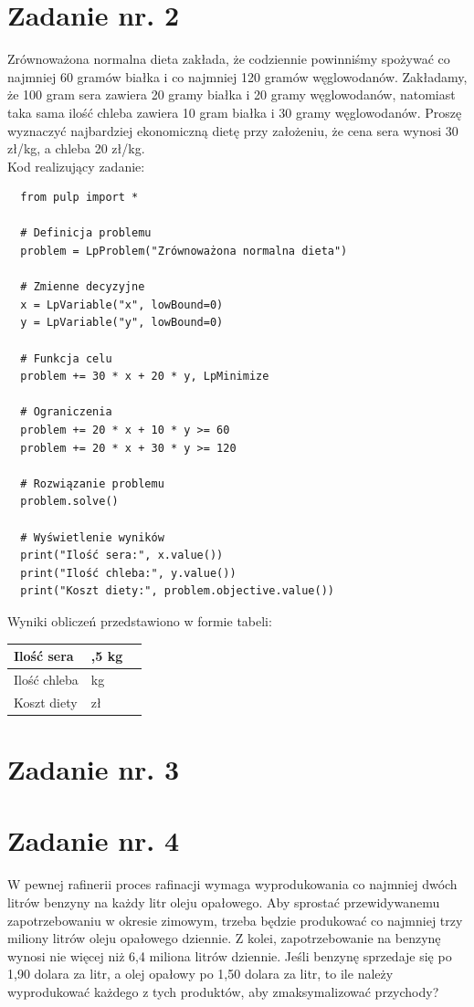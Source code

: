 \documentclass{article}
\begin{document}
\section{Zadanie nr. 2}
Zrównoważona normalna dieta zakłada, że codziennie powinniśmy spożywać co 
najmniej 60 gramów białka i co najmniej 120 gramów węglowodanów. Zakładamy, że 100 
gram sera zawiera 20 gramy białka i 20 gramy węglowodanów, natomiast taka sama ilość 
chleba zawiera 10 gram białka i 30 gramy węglowodanów. Proszę wyznaczyć najbardziej 
ekonomiczną dietę przy założeniu, że cena sera wynosi 30 zł/kg, a chleba 20 zł/kg.\\

Kod realizujący zadanie:
\begin{lstlisting}
  from pulp import *

  # Definicja problemu
  problem = LpProblem("Zrównoważona normalna dieta")
  
  # Zmienne decyzyjne
  x = LpVariable("x", lowBound=0)
  y = LpVariable("y", lowBound=0)
  
  # Funkcja celu
  problem += 30 * x + 20 * y, LpMinimize
  
  # Ograniczenia
  problem += 20 * x + 10 * y >= 60
  problem += 20 * x + 30 * y >= 120
  
  # Rozwiązanie problemu
  problem.solve()
  
  # Wyświetlenie wyników
  print("Ilość sera:", x.value())
  print("Ilość chleba:", y.value())
  print("Koszt diety:", problem.objective.value())
\end{lstlisting}


Wyniki obliczeń przedstawiono w formie tabeli:

\begin{tabularx}{0.8\textwidth} { 
  | >{\raggedright\arraybackslash}X 
  | >{\centering\arraybackslash}X 
  | >{\raggedleft\arraybackslash}X | }
 \hline
 Ilość sera & 1,5 kg  \\
 \hline
 Ilość chleba  & 3 kg  \\
 \hline
 Koszt diety  & 105 zł  \\
\hline
\end{tabularx}

\section{Zadanie nr. 3}

\section{Zadanie nr. 4}
W pewnej rafinerii proces rafinacji wymaga wyprodukowania co najmniej dwóch
litrów benzyny na każdy litr oleju opałowego. Aby sprostać przewidywanemu zapotrzebowaniu
w okresie zimowym, trzeba będzie produkować co najmniej trzy miliony litrów oleju
opałowego dziennie. Z kolei, zapotrzebowanie na benzynę wynosi nie więcej niż 6,4 miliona
litrów dziennie. Jeśli benzynę sprzedaje się po 1,90 dolara za litr, a olej opałowy po 1,50 dolara
za litr, to ile należy wyprodukować każdego z tych produktów, aby zmaksymalizować
przychody?
\newline
\end{document}
